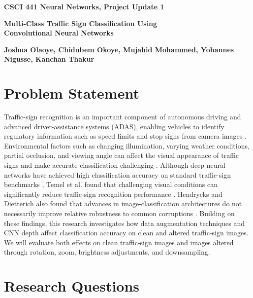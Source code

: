 \documentclass[11pt,letterpaper]{article}
\begin{document}
\noindent\hfill
{\footnotesize\bfseries CSCI 441 Neural Networks, Project Update 1}
\par

\vspace{1.5em}

\begin{center}
    {\Large\bfseries
    Multi-Class Traffic Sign Classification Using
    \\Convolutional Neural Networks\par}

    \vspace{0.9em}

    {\small\bfseries
    Joshua Olaoye, Chidubem Okoye, Mujahid Mohammed,
    Yohannes Nigusse, Kanchan Thakur\par}
\end{center}

\vspace{1em}

\section*{Problem Statement}
Traffic-sign recognition is an important component of autonomous driving and advanced driver-assistance systems (ADAS), enabling vehicles to identify regulatory information such as speed limits and stop signs from camera images \cite{dong2024applications}. 
Environmental factors such as changing illumination, varying weather conditions, partial occlusion, and viewing angle can affect the visual appearance of traffic signs and make accurate classification challenging \cite{stallkamp2011gtsrb}. 
Although deep neural networks have achieved high classification accuracy on standard traffic-sign benchmarks \cite{ciresan2012traffic}, Temel et al. found that challenging visual conditions can significantly reduce traffic-sign recognition performance \cite{temel2017cure}. 
Hendrycks and Dietterich also found that advances in image-classification architectures do not necessarily improve relative robustness to common corruptions \cite{hendrycks2019robustness}. 
Building on these findings, this research investigates how data augmentation techniques and CNN depth affect classification accuracy on clean and altered traffic-sign images.
We will evaluate both effects on clean traffic-sign images and images altered through rotation, zoom, brightness adjustments, and downsampling.

\section*{Research Questions}
\end{document}

